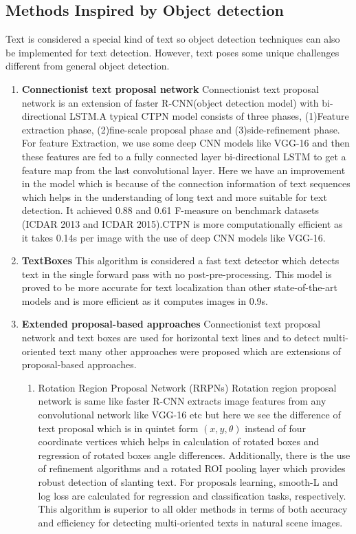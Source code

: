 \subsection{Methods Inspired by Object detection}
Text is considered a special kind of text so object detection techniques can also be implemented for text detection. However, text poses some unique challenges different from general object detection.

\begin{enumerate}
    \item \textbf{Connectionist text proposal network}  \newline
    Connectionist text proposal network \cite{CTPN}  is an extension of faster R-CNN(object detection model) with bi-directional LSTM.A typical CTPN model consists of three phases, (1)Feature extraction phase, (2)fine-scale proposal phase and (3)side-refinement phase. For feature Extraction, we use some deep CNN models like VGG-16 and then these features are fed to a fully connected layer bi-directional LSTM to get a feature map from the last convolutional layer. Here we have an improvement in the model which is because of the connection information of text sequences which helps in the understanding of long text and more suitable for text detection. It achieved 0.88 and 0.61 F-measure on benchmark datasets (ICDAR 2013 and ICDAR 2015).CTPN is more computationally efficient as it takes 0.14s per image with the use of deep CNN models like VGG-16.
    \item \textbf{TextBoxes}  \newline
    This algorithm \cite{textboxes} is considered a fast text detector which detects text in the single forward pass with no post-pre-processing. This model is proved to be more accurate for text localization than other state-of-the-art models and is more efficient as it computes images in 0.9s.
    
    \item \textbf{Extended proposal-based approaches} \newline
    Connectionist text proposal network and text boxes are used for horizontal text lines and to detect multi-oriented text many other approaches were proposed which are extensions of proposal-based approaches.
    \begin{enumerate}
        \item Rotation Region Proposal Network (RRPNs) \newline
        Rotation region proposal network is same like faster R-CNN extracts image features from any convolutional network like VGG-16 etc but here we see the difference of text proposal which is in quintet form $(x, y, \theta)$ instead of four coordinate vertices which helps in calculation of rotated boxes and regression of rotated boxes angle differences. Additionally, there is the use of refinement algorithms and a rotated ROI pooling layer which provides robust detection of slanting text. For proposals learning, smooth-L and log loss are calculated for regression and classification tasks, respectively. This algorithm is superior to all older methods in terms of both accuracy and efficiency for detecting multi-oriented texts in natural scene images.
        

\end{enumerate}
\end{enumerate}
